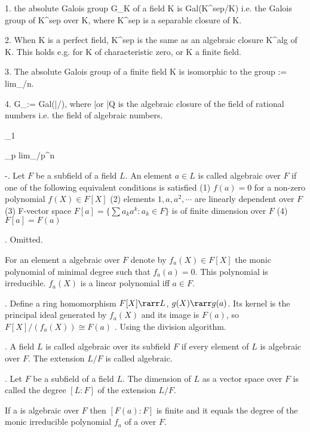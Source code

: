 

1. the absolute Galois group G_K of a field K is Gal(K^{sep}/K) 
i.e. the Galois group of K^{sep} over K, where K^sep is a separable closure of K.

2. When K is a perfect field, K^{sep} is the same as an algebraic closure K^{alg} of K. 
This holds e.g. for K of characteristic zero, or K a finite field. 

3. The absolute Galois group of a finite field K is isomorphic to the group
 := lim_\larr {}/n. 

4. G_\Q := Gal(\bar\Q/\Q), where \bar\Q or \bar Q is the algebraic closure of 
the field of rational numbers i.e. the field of algebraic numbers.

\F_1

\Z_p  lim_{\larr}\Z/p^n\Z





-\lemma. Let $F$ be a subfield of a field $L$. An element $a \in L$ is called 
algebraic over $F$ if one of the following equivalent conditions is satisfied 
  (1) $f(a) = 0$ for a non-zero polynomial $f(X) \in F[X]$
  (2) elements $1, a, a^2, \cdots$ are linearly dependent over $F$
  (3) F-vector space $F[a] = \{ \sum a_ka^k : a_k \in F \}$ is of finite dimension over $F$
  (4) $F[a] = F(a)$

\proof. Omitted.

  For an element a algebraic over $F$ denote by
                                $f_a(X) \in F[X]$
the monic polynomial of minimal degree such that $f_a(a) = 0$. 
  This polynomial is irreducible. $f_a(X)$ is a linear polynomial iff $a \in F$.

\lemma. Define a ring homomorphism $F[X] \rarr L$, $g(X) \rarr g(a)$. Its kernel is the
principal ideal generated by $f_a(X)$ and its image is $F(a)$, so
                              $F[X]/(f_a(X)) \cong F(a)$
\proof. Using the division algorithm.
                            
. A field $L$ is called algebraic over its subfield $F$ if every element of $L$ is
algebraic over $F$. The extension $L/F$ is called algebraic. 

. Let $F$ be a subfield of a field $L$. The dimension of $L$ as a vector space
over $F$ is called the degree $[L : F]$ of the extension $L/F$.

  If a is algebraic over $F$ then $[F(a) : F]$ is finite and it equals the degree of the
monic irreducible polynomial $f_a$ of a over $F$.



